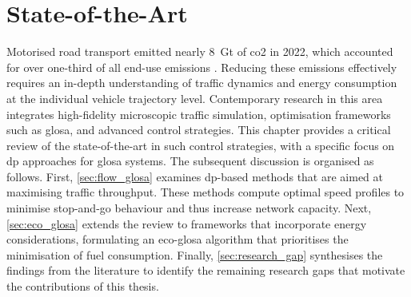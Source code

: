 \chapter{State-of-the-Art}
\label{ch:State_of_the_Art}

Motorised road transport emitted nearly \SI{8}{\giga\tonne} of \ac{co2} in 2022, which accounted for over one-third of all end-use emissions \cite{IEATransport2024}. Reducing these emissions effectively requires an in-depth understanding of traffic dynamics and energy consumption at the individual vehicle trajectory level. Contemporary research in this area integrates high-fidelity microscopic traffic simulation, optimisation frameworks such as \ac{glosa}, and advanced control strategies.
\mynewline
This chapter provides a critical review of the state-of-the-art in such control strategies, with a specific focus on \ac{dp} approaches for \ac{glosa} systems. The subsequent discussion is organised as follows. First, \vref{sec:flow_glosa} examines \ac{dp}-based methods that are aimed at maximising traffic throughput. These methods compute optimal speed profiles to minimise stop-and-go behaviour and thus increase network capacity. Next, \vref{sec:eco_glosa} extends the review to frameworks that incorporate energy considerations, formulating an \ac{eco-glosa} algorithm that prioritises the minimisation of fuel consumption. Finally, \vref{sec:research_gap} synthesises the findings from the literature to identify the remaining research gaps that motivate the contributions of this thesis.






